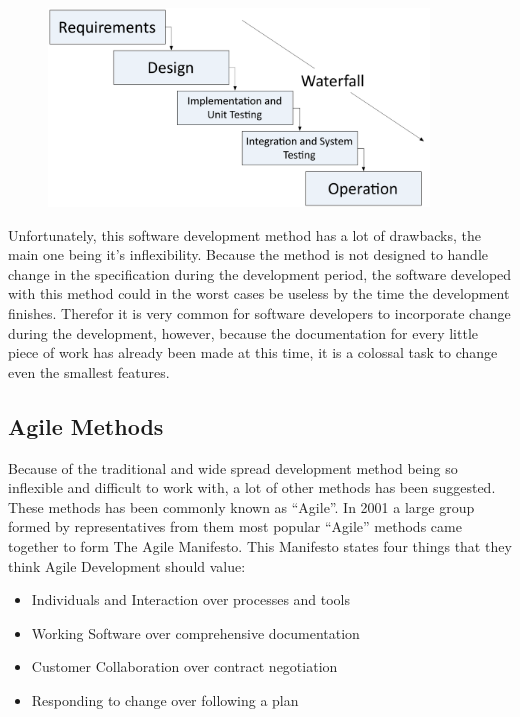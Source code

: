 \begin{figure}[H]
	\centering
		\includegraphics[width=0.90\textwidth]{input/implementation/development/waterfall.pdf}
	\label{fig:WaterfallPic}
\end{figure}

Unfortunately, this software development method has a lot of drawbacks, the main one being it's inflexibility. Because the method is not designed to handle change in the specification during the development period, the software developed with this method could in the worst cases be useless by the time the development finishes. Therefor it is very common for software developers to incorporate change during the development, however, because the documentation for every little piece of work has already been made at this time, it is a colossal task to change even the smallest features. 

\subsection{Agile Methods}

Because of the traditional and wide spread development method being so inflexible and difficult to work with, a lot of other methods has been suggested. These methods has been commonly known as ``Agile''. In 2001 a large group formed by representatives from them most popular ``Agile'' methods came together to form The Agile Manifesto. This Manifesto states four things that they think Agile Development should value:
\begin{itemize}
	\item Individuals and Interaction over processes and tools
	\item Working Software over comprehensive documentation
	\item Customer Collaboration over contract negotiation
	\item Responding to change over following a plan
\end{itemize}

